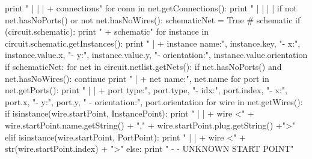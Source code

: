 \begin{DoxyCodeInclude}
    \textcolor{keywordflow}{print} \textcolor{stringliteral}{" | | | + connections"}
    \textcolor{keywordflow}{for} conn \textcolor{keywordflow}{in} net.getConnections():
      \textcolor{keywordflow}{print} \textcolor{stringliteral}{" | | | | %
    \textcolor{keywordflow}{if} \textcolor{keywordflow}{not} net.hasNoPorts() \textcolor{keywordflow}{or} \textcolor{keywordflow}{not} net.hasNoWires():
      schematicNet = \textcolor{keyword}{True}
  \textcolor{comment}{# schematic}
  \textcolor{keywordflow}{if} (circuit.schematic):
    \textcolor{keywordflow}{print} \textcolor{stringliteral}{" + schematic"}
    \textcolor{keywordflow}{for} instance \textcolor{keywordflow}{in} circuit.schematic.getInstances():
      \textcolor{keywordflow}{print} \textcolor{stringliteral}{" | + instance name:"}, instance.key, \textcolor{stringliteral}{"- x:"}, instance.value.x, \textcolor{stringliteral}{"- y:"}, instance.value.y, \textcolor{stringliteral}{"-
       orientation:"}, instance.value.orientation 
    \textcolor{keywordflow}{if} schematicNet:
      \textcolor{keywordflow}{for} net \textcolor{keywordflow}{in} circuit.netlist.getNets():
          \textcolor{keywordflow}{if} net.hasNoPorts() \textcolor{keywordflow}{and} net.hasNoWires():
              \textcolor{keywordflow}{continue}
          \textcolor{keywordflow}{print} \textcolor{stringliteral}{" | + net name:"}, net.name
          \textcolor{keywordflow}{for} port \textcolor{keywordflow}{in} net.getPorts():
              \textcolor{keywordflow}{print} \textcolor{stringliteral}{" | | + port type:"}, port.type, \textcolor{stringliteral}{"- idx:"}, port.index, \textcolor{stringliteral}{"- x:"}, port.x, \textcolor{stringliteral}{"- y:"}, port.y, \textcolor{stringliteral}{"
      - orientation:"}, port.orientation
          \textcolor{keywordflow}{for} wire \textcolor{keywordflow}{in} net.getWires():
              \textcolor{keywordflow}{if} isinstance(wire.startPoint, InstancePoint):
                  \textcolor{keywordflow}{print} \textcolor{stringliteral}{" | | + wire <"} + wire.startPoint.name.getString() + \textcolor{stringliteral}{","} + 
      wire.startPoint.plug.getString() +\textcolor{stringliteral}{">"}
              \textcolor{keywordflow}{elif} isinstance(wire.startPoint, PortPoint):
                  \textcolor{keywordflow}{print} \textcolor{stringliteral}{" | | + wire <"} + str(wire.startPoint.index) + \textcolor{stringliteral}{">"}
              \textcolor{keywordflow}{else}:
                  \textcolor{keywordflow}{print} \textcolor{stringliteral}{" - - UNKNOWN START POINT"}
}
\end{DoxyCodeInclude}
